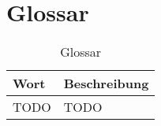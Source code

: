 \chapter{Glossar}
  \begin{longtable}{|p{4cm}|p{10cm}|}
      \caption{Glossar}\\
\hline
  Wort & Beschreibung\\
  \hline
  TODO & TODO\\
  \hline
  
  \end{longtable}


